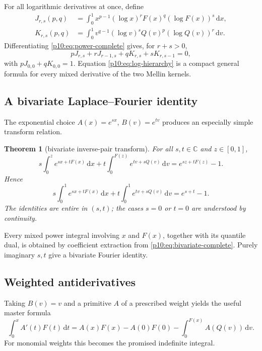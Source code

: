 \documentclass[11pt,oneside]{article}
\newtheorem{theorem}{Theorem}[section]
\theoremstyle{definition}
\theoremstyle{remark}
\newcommand{\F}{F}
\newcommand{\Q}{Q}
\newcommand{\C}{\mathbb C}
\newcommand{\dd}{\,\mathrm d}
\newcommand{\1}{\mathbf 1}
\begin{document}
For all logarithmic derivatives at once, define
\begin{align}
 J_{r,s}(p,q)&=\int_0^1x^{p-1}(\log x)^r\F(x)^q(\log\F(x))^s\dd x,\label{p10:eq:Jrs}\\
 K_{r,s}(p,q)&=\int_0^1v^{q-1}(\log v)^s\Q(v)^p(\log\Q(v))^r\dd v.\label{p10:eq:Krs}
\end{align}
Differentiating \cref{p10:eq:power-complete} gives, for \(r+s>0\),
\begin{equation}\label{p10:eq:log-hierarchy}
 pJ_{r,s}+rJ_{r-1,s}+qK_{r,s}+sK_{r,s-1}=0,
\end{equation}
with \(pJ_{0,0}+qK_{0,0}=1\).  Equation \cref{p10:eq:log-hierarchy} is a compact
general formula for every mixed derivative of the two Mellin kernels.

\subsection{A bivariate Laplace--Fourier identity}

The exponential choice \(A(x)=e^{sx}\), \(B(v)=e^{tv}\) produces an especially
simple transform relation.

\begin{theorem}[bivariate inverse-pair transform]\label{p10:thm:bivariate-exp}
For all \(s,t\in\C\) and \(z\in[0,1]\),
\begin{equation}\label{p10:eq:bivariate-incomplete}
 s\int_0^z e^{sx+t\F(x)}\dd x
 +t\int_0^{\F(z)}e^{tv+s\Q(v)}\dd v
 =e^{sz+t\F(z)}-1.
\end{equation}
Hence
\begin{equation}\label{p10:eq:bivariate-complete}
 s\int_0^1e^{sx+t\F(x)}\dd x
 +t\int_0^1e^{tv+s\Q(v)}\dd v
 =e^{s+t}-1.
\end{equation}
The identities are entire in \((s,t)\); the cases \(s=0\) or \(t=0\) are understood
by continuity.
\end{theorem}

Every mixed power integral involving \(x\) and \(\F(x)\), together with its quantile
dual, is obtained by coefficient extraction from \cref{p10:eq:bivariate-complete}.  Purely
imaginary \(s,t\) give a bivariate Fourier identity.

\subsection{Weighted antiderivatives}

Taking \(B(v)=v\) and a primitive \(A\) of a prescribed weight yields the useful
master formula
\begin{equation}\label{p10:eq:weighted-antiderivative-master}
 \int_0^x A'(t)\F(t)\dd t
 =A(x)\F(x)-A(0)\F(0)-\int_0^{\F(x)}A(\Q(v))\dd v.
\end{equation}
For monomial weights this becomes the promised indefinite integral.
\end{document}
